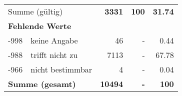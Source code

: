 \begin{longtable}{lXrrr}
     \midrule
     \multicolumn{2}{l}{Summe (gültig)} &
       \textbf{\num{3331}} &
     \textbf{100} &
       \textbf{\num[round-mode=places,round-precision=2]{31,74}} \\
     \multicolumn{5}{l}{\textbf{Fehlende Werte}}\\
       -998 &
       keine Angabe &
         \num{46} &
        - &
         \num[round-mode=places,round-precision=2]{0,44} \\
       -988 &
       trifft nicht zu &
         \num{7113} &
        - &
         \num[round-mode=places,round-precision=2]{67,78} \\
       -966 &
       nicht bestimmbar &
         \num{4} &
        - &
         \num[round-mode=places,round-precision=2]{0,04} \\
     \midrule
     \multicolumn{2}{l}{\textbf{Summe (gesamt)}} &
          \textbf{\num{10494}} &
        \textbf{-} &
        \textbf{100} \\
     \bottomrule
     \end{longtable}
     
